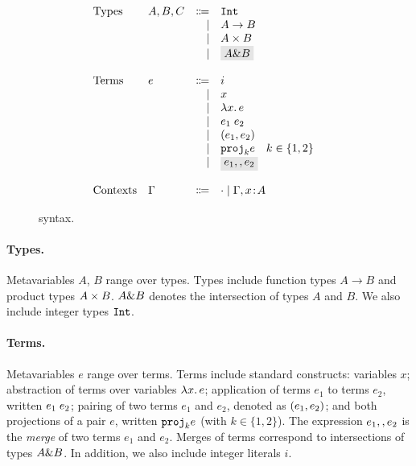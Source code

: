 \begin{figure}[t]
  \[
    \begin{array}{l}
      \begin{array}{llrll}
        \text{Types}
        & A, B, C & \Coloneqq & \code{Int} & \\
        &         & \mid      & A \to B   & \\
        &         & \mid      & \tpair A B & \\
        &         & \mid      & \highlight{$A \inter B$}  & \\

        \\
        \text{Terms}
        & e & \Coloneqq & i                      & \\
        &   & \mid & x                           & \\
        &   & \mid & \lamty x A e                & \\
        &   & \mid & \app {e_1} {e_2}            & \\
        &   & \mid & \pair {e_1} {e_2}           & \\
        &   & \mid & \proj k e \quad k \in \{ 1 , 2 \} & \\
        &   & \mid & \highlight{$e_1 \mergeop e_2$}  & \\

        \\
        \text{Contexts}
        & \Gamma & \Coloneqq & \cdot
                   \mid \Gamma, x \oftype A  & \\
      \end{array}
    \end{array}
  \]

  \caption{\name syntax.}
  \label{fig:fi-syntax}
\end{figure}

\paragraph{Types.} Metavariables $A$, $B$ range over types. Types include
function types $A \to B$ and product types $\tpair A B$. 
$A \inter B$ denotes the intersection of types $A$ and
$B$. We also include integer types $\code{Int}$.

\paragraph{Terms.} Metavariables $e$ range over terms.  Terms include standard
constructs: variables $x$; abstraction of terms over variables
$\lamty x A e$; application of terms $e_1$ to terms $e_2$, written $\app
{e_1} {e_2}$; pairing of two terms $e_1$ and $e_2$, denoted as $\pair {e_1} {e_2}$;
and both projections of a pair $e$, written $\proj k e$ (with $k \in \{1,2\}$).
The expression $e_1 \mergeop e_2$ is the \emph{merge} of two terms
$e_1$ and $e_2$. Merges of terms correspond to intersections of types $A \inter
B$. 
In addition, we also include integer literals $i$.

